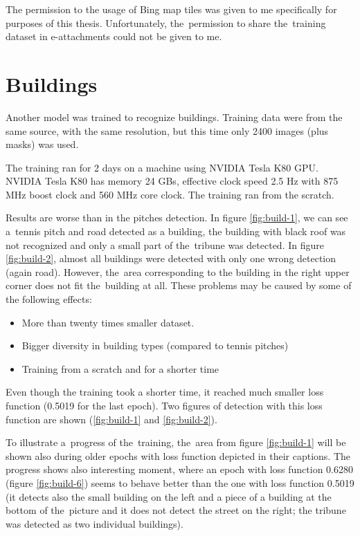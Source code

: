 The permission to the usage of Bing map tiles was given to me specifically for 
purposes of this thesis. Unfortunately, the~permission to share the~training 
dataset in e-attachments could not be given to me.

\section{Buildings}

Another model was trained to recognize buildings. Training data were from the
same source, with the same resolution, but this time only 2400 images (plus
masks) was used.

The training ran for 2 days on a machine using NVIDIA Tesla K80 GPU. NVIDIA
Tesla K80 has memory 24 GBs, effective clock speed 2.5 Hz with 875 MHz boost
clock and 560 MHz core clock. The training ran from the scratch.

Results are worse than in the pitches detection. In figure \ref{fig:build-1},
we can see a~tennis pitch and road detected as a building, the building with
black roof was not recognized and only a small part of the~tribune was
detected. In figure \ref{fig:build-2}, almost all buildings were detected with
only one wrong detection (again road). However, the~area corresponding to the
building in the right upper corner does not fit the~building at all.
These problems may be caused by some of the following effects:
\begin{itemize}
	\item More than twenty times smaller dataset.
	\item Bigger diversity in building types (compared to tennis pitches)
	\item Training from a scratch and for a shorter time
\end{itemize}

Even though the training took a shorter time, it reached much smaller loss
function (0.5019 for the last epoch). Two figures of detection with this loss
function are shown (\ref{fig:build-1} and \ref{fig:build-2}).

To illustrate
a~progress of the~training, the~area from figure \ref{fig:build-1} will be
shown also during older epochs with loss function depicted in their captions.
The progress shows also interesting moment, where an epoch with loss function
0.6280 (figure \ref{fig:build-6}) seems to behave better than the one with loss
function 0.5019 (it detects also the small building on the left and a piece of
a building at the bottom of the~picture and it does not detect the street on
the right; the tribune was detected as two individual buildings).

